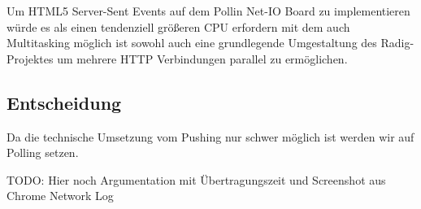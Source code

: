 Um HTML5 Server-Sent Events auf dem Pollin Net-IO Board zu implementieren würde es als 
einen tendenziell größeren CPU erfordern mit dem auch Multitasking möglich ist sowohl auch 
eine grundlegende Umgestaltung des Radig-Projektes um mehrere HTTP Verbindungen parallel 
zu ermöglichen.

\subsection{Entscheidung}
Da die technische Umsetzung vom Pushing nur schwer möglich ist werden wir auf Polling 
setzen.

TODO: Hier noch Argumentation mit Übertragungszeit und Screenshot aus Chrome Network Log


%	
